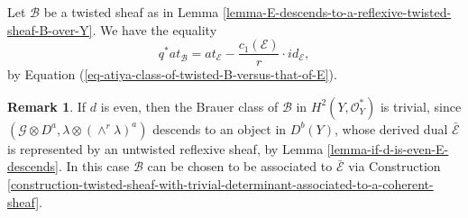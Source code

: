\documentclass[12pt]{amsart}
\numberwithin{equation}{subsection}
\theoremstyle{plain}
\theoremstyle{definition}
\newtheorem{rem}[thm]{Remark}
\newcommand{\B}{{\mathcal B}}
\newcommand{\E}{{\mathcal E}}
\newcommand{\G}{{\mathcal G}}
\newcommand{\PP}{{\mathbb P}}
\newcommand{\StructureSheaf}[1]{{\mathcal O}_{#1}}
\begin{document}

Let $\B$ be a twisted sheaf as in Lemma \ref{lemma-E-descends-to-a-reflexive-twisted-sheaf-B-over-Y}.
We have the equality
\begin{equation}
\label{eq-at-tw-B-versus-at-E}
q^*at^{}_\B=at_\E-\frac{c_1(\E)}{r}\cdot id_\E,
\end{equation} 
by Equation (\ref{eq-atiya-class-of-twisted-B-versus-that-of-E}).

\begin{rem}
If $d$ is even, then the Brauer class of $\B$ in $H^2(Y,\StructureSheaf{Y}^*)$ is trivial, since $(\G\otimes D^a,\lambda\otimes(\wedge^r\lambda)^a)$ descends
to an object in $D^b(Y)$, whose derived dual $\bar{\E}$ is represented by an untwisted reflexive sheaf, by Lemma \ref{lemma-if-d-is-even-E-descends}.
In this case $\B$ can be chosen to be associated to $\bar{\E}$ via Construction \ref{construction-twisted-sheaf-with-trivial-determinant-associated-to-a-coherent-sheaf}.
\end{rem}
\end{document}
